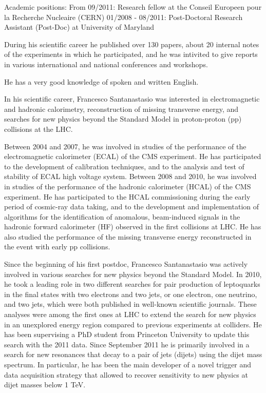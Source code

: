 \documentclass[10pt, a4paper]{article}
\begin{document}
Academic positions: 
From 09/2011: Research fellow at the Conseil Europeen pour la Recherche Nucleaire (CERN)
01/2008 - 08/2011: Post-Doctoral Research Assistant (Post-Doc) at University of Maryland

During his scientific career he published over 130 papers, about 20 internal notes of the experiments in which he participated, and he was intivited to give reports in various international and national conferences and workshops. 

He has a very good knowledge of spoken and written English. 

In his scientific career, Francesco Santanastasio was interested in electromagnetic and hadronic calorimetry, reconstruction of missing transverse energy, and searches for new physics beyond the Standard Model in proton-proton (pp) collisions at the LHC.

Between 2004 and 2007, he was involved in studies of the performance of the electromagnetic calorimeter (ECAL) of the CMS experiment. He has participated to the development of calibration techniques, and to the analysis and test of stability of ECAL high voltage system.
Between 2008 and 2010, he was involved in studies of the performance of the hadronic calorimeter (HCAL) of the CMS experiment. He has participated to the HCAL commissioning during the early period of cosmic-ray data taking, and to the development and implementation of algorithms for the identification of anomalous, beam-induced signals in the hadronic forward calorimeter (HF) observed in the first collisions at LHC. He has also studied the performance of the missing transverse energy reconstructed in the event with early pp collisions. 

Since the beginning of his first postdoc, Francesco Santanastasio was actively involved in various searches for new physics beyond the Standard Model. In 2010, he took a leading role in two different searches for pair production of leptoquarks in the final states with two electrons and two jets, or one electron, one neutrino, and two jets, which were both published in well-known scientific journals. These analyses were among the first ones at LHC to extend the search for new physics in an unexplored energy region compared to previous experiments at colliders. He has been supervising a PhD student from Princeton University to update this search with the 2011 data. Since September 2011 he is primarily involved in a search for new resonances that decay to a pair of jets (dijets) using the dijet mass spectrum. In particular, he has been the main developer of a novel trigger and data acquisition strategy that allowed to recover sensitivity to new physics at dijet masses below 1 TeV.
\end{document}
